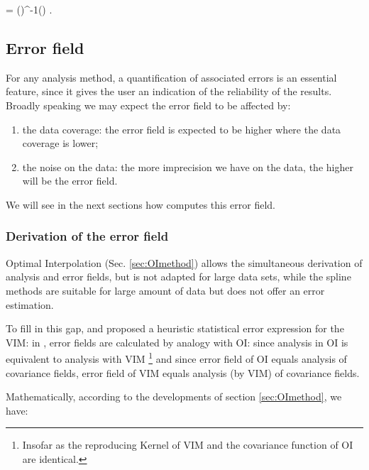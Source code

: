 \be
\boldsymbol{\varphi} = ()^{-1}() .
\label{eq:solution2}
\ee


\subsection{Error field}

For any analysis method, a quantification of associated errors is an essential feature, since it gives the user an indication of the reliability of the results. Broadly speaking we may expect the error field to be affected by:
\begin{enumerate}
\item the data coverage: the error field is expected to be higher where the data coverage is lower;
\item the noise on the data: the more imprecision we have on the data, the higher will be the error field.
\end{enumerate}

We will see in the next sections how \diva computes this error field.

\subsubsection{Derivation of the error field}

Optimal Interpolation (Sec. \ref{sec:OImethod}) allows the simultaneous derivation of analysis and error fields, but is not adapted for large data sets, while the spline methods are suitable for large amount of data but does not offer an error estimation.

To fill in this gap, \cite{BRANKART98} and \cite{RIXEN00} proposed a heuristic statistical error expression for the VIM: in \diva, error fields are calculated by analogy with OI: since analysis in OI is equivalent to analysis with VIM \footnote{Insofar as the reproducing Kernel of VIM and the covariance function of OI are identical.} and 
since error field of OI equals analysis of covariance fields, error field of VIM equals analysis (by VIM) of covariance fields.

Mathematically, according to the developments of section \ref{sec:OImethod}, we have:

